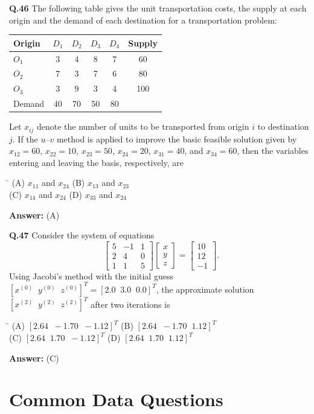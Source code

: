 \documentclass[11pt,a4paper]{article}
\newcommand{\optsfourA}[4]{%
  \begin{tabbing}
    \hspace{0.48\linewidth}\=\kill
    (A) #1 \> (B) #2 \\[2pt]
    (C) #3 \> (D) #4
  \end{tabbing}%
}
\newcommand{\ans}[1]{\textbf{Answer:} #1\par\medskip}
\begin{document}
\textbf{Q.46} The following table gives the unit transportation costs, the supply at each origin and the demand of each destination for a transportation problem:
\begin{center}
\begin{tabular}{lccccc}
  \toprule
  Origin & $D_1$ & $D_2$ & $D_3$ & $D_4$ & Supply \\
  \midrule
  $O_1$ & 3 & 4 & 8 & 7 & 60 \\
  $O_2$ & 7 & 3 & 7 & 6 & 80 \\
  $O_3$ & 3 & 9 & 3 & 4 & 100 \\
  \midrule
  Demand & 40 & 70 & 50 & 80 & \\
  \bottomrule
\end{tabular}
\end{center}
Let $x_{ij}$ denote the number of units to be transported from origin $i$ to destination $j$. If the $u$--$v$ method is applied to improve the basic feasible solution given by $x_{12} = 60$, $x_{22} = 10$, $x_{23} = 50$, $x_{24} = 20$, $x_{31} = 40$, and $x_{34} = 60$, then the variables entering and leaving the basis, respectively, are
\optsfourA{$x_{11}$ and $x_{24}$}{$x_{13}$ and $x_{23}$}{$x_{14}$ and $x_{24}$}{$x_{33}$ and $x_{24}$}
\ans{(A)}

\textbf{Q.47} Consider the system of equations
\[
  \begin{bmatrix} 5 & -1 & 1 \\ 2 & 4 & 0 \\ 1 & 1 & 5 \end{bmatrix}
  \begin{bmatrix} x \\ y \\ z \end{bmatrix}
  =
  \begin{bmatrix} 10 \\ 12 \\ -1 \end{bmatrix}.
\]
Using Jacobi's method with the initial guess $[x^{(0)}\;\;y^{(0)}\;\;z^{(0)}]^T = [2.0\;\;3.0\;\;0.0]^T$, the approximate solution $[x^{(2)}\;\;y^{(2)}\;\;z^{(2)}]^T$ after two iterations is
\optsfourA{$[2.64\;\;-1.70\;\;-1.12]^T$}{$[2.64\;\;-1.70\;\;1.12]^T$}{$[2.64\;\;1.70\;\;-1.12]^T$}{$[2.64\;\;1.70\;\;1.12]^T$}
\ans{(C)}

\section*{Common Data Questions}
\end{document}
